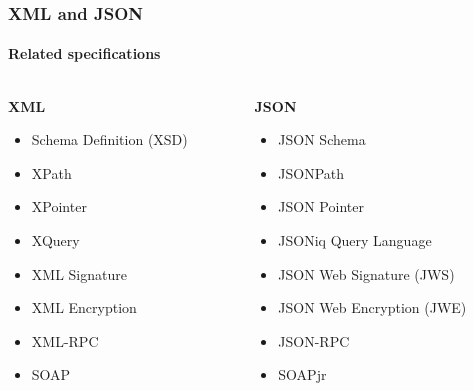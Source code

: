 \documentclass[
    alternativetitlepage=alternativ,
    cornerlogo=hgi_nds_logo2,
    sectionoverview,
]{rubpresentation}
\begin{document}
\begin{frame}[t]
    \frametitle{XML and JSON}
    \framesubtitle{Related specifications}
    \begin{columns}[t]
        \begin{column}{0.5\textwidth}
            \begin{center}\textbf{\Large XML}\end{center}
            \begin{itemize}
                \item{} Schema Definition (XSD)\\
                \item{} XPath\\
                \item{} XPointer\\
                \item{} XQuery\\
                \item{} XML Signature\\
                \item{} XML Encryption\\
                \item{} XML-RPC\\
                \item{} SOAP
            \end{itemize}
        \end{column}
        \begin{column}{0.5\textwidth}
            \begin{center}\textbf{\Large JSON}\end{center}
            \begin{itemize}
                \item{} JSON Schema\\
                \item{} JSONPath\\
                \item{} JSON Pointer\\
                \item{} JSONiq Query Language\\
                \item{} JSON Web Signature (JWS)
                \item{} JSON Web Encryption (JWE)
                \item{} JSON-RPC\\
                \item{} SOAPjr\\

\end{itemize}
\end{column}
\end{columns}
\end{frame}
\end{document}
